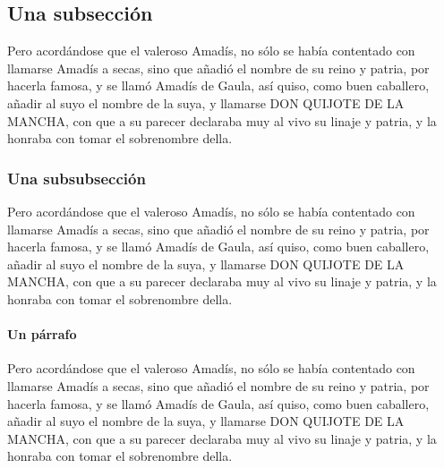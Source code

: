 \subsection{Una subsección}
Pero acordándose que
el valeroso Amadís, no sólo se había contentado con llamarse Amadís a
secas, sino que añadió el nombre de su reino y patria, por hacerla
famosa, y se llamó Amadís de Gaula, así quiso, como buen caballero,
añadir al suyo el nombre de la suya, y llamarse DON QUIJOTE DE LA
MANCHA, con que a su parecer declaraba muy al vivo su linaje y patria,
y la honraba con tomar el sobrenombre della.



\subsubsection{Una subsubsección}
Pero acordándose que
el valeroso Amadís, no sólo se había contentado con llamarse Amadís a
secas, sino que añadió el nombre de su reino y patria, por hacerla
famosa, y se llamó Amadís de Gaula, así quiso, como buen caballero,
añadir al suyo el nombre de la suya, y llamarse DON QUIJOTE DE LA
MANCHA, con que a su parecer declaraba muy al vivo su linaje y patria,
y la honraba con tomar el sobrenombre della.



\paragraph{Un párrafo}
Pero acordándose que
el valeroso Amadís, no sólo se había contentado con llamarse Amadís a
secas, sino que añadió el nombre de su reino y patria, por hacerla
famosa, y se llamó Amadís de Gaula, así quiso, como buen caballero,
añadir al suyo el nombre de la suya, y llamarse DON QUIJOTE DE LA
MANCHA, con que a su parecer declaraba muy al vivo su linaje y patria,
y la honraba con tomar el sobrenombre della.


